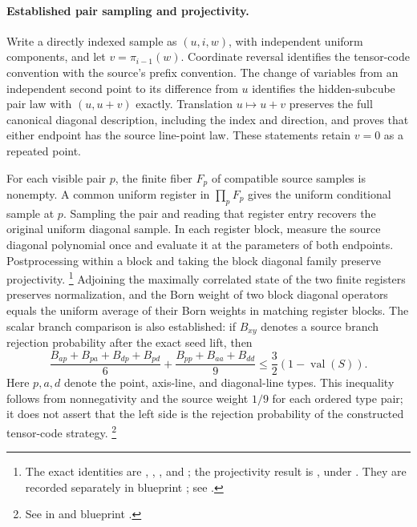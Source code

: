 \documentclass[11pt]{article}
\begin{document}
\paragraph{Established pair sampling and projectivity.}
Write a directly indexed sample as $(u,i,w)$, with independent uniform
components, and let $v=\pi_{i-1}(w)$. Coordinate reversal identifies the
tensor-code convention with the source's prefix convention. The change of
variables from an independent second point to its difference from $u$
identifies the hidden-subcube pair law with $(u,u+v)$ exactly. Translation
$u\mapsto u+v$ preserves the full canonical diagonal description, including
the index and direction, and proves that either endpoint has the source
line-point law. These statements retain $v=0$ as a repeated point.

For each visible pair $p$, the finite fiber $F_p$ of compatible source
samples is nonempty. A common uniform register in $\prod_p F_p$ gives the
uniform conditional sample at $p$. Sampling the pair and reading that
register entry recovers the original uniform diagonal sample. In each
register block, measure the source diagonal polynomial once and evaluate
it at the parameters of both endpoints. Postprocessing within a block
and taking the block diagonal family preserve projectivity.%
\footnote{The exact identities are
,
,
, and ;
the projectivity result is , under
. They are recorded separately
in blueprint ; see .}
Adjoining the maximally correlated state of the two finite registers
preserves normalization, and the Born weight of two block diagonal
operators equals the uniform average of their Born weights in matching
register blocks. The scalar branch comparison is also established:
if $B_{xy}$ denotes a source branch rejection probability after the exact
seed lift, then
\[
 \frac{B_{ap}+B_{pa}+B_{dp}+B_{pd}}6+
 \frac{B_{pp}+B_{aa}+B_{dd}}9\le\frac32(1-\operatorname{val}(S)).
\]
Here $p,a,d$ denote the point, axis-line, and diagonal-line types. This
inequality follows from nonnegativity and the source weight $1/9$ for each
ordered type pair; it does not assert that the left side is the rejection
probability of the constructed tensor-code strategy.%
\footnote{See  in
 and blueprint
.}
\end{document}
